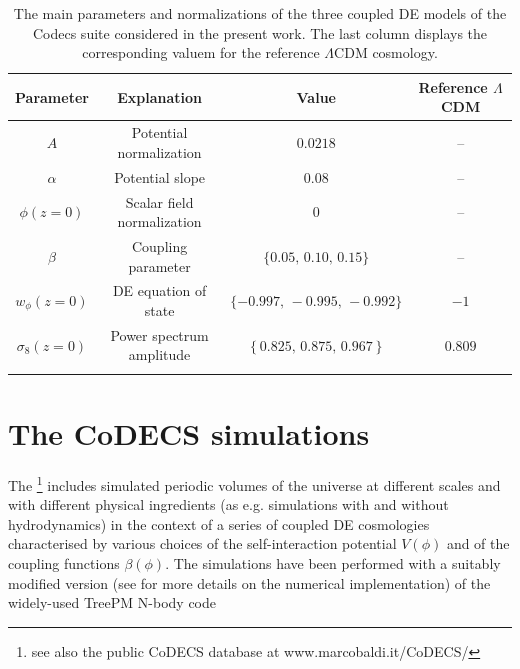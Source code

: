 \begin{table}
\footnotesize
\centering{}\label{tab:models} %
\begin{tabular}{ccc|c}
\textbf{Parameter}  & \textbf{Explanation}  & \textbf{Value}  & \textbf{Reference $\Lambda$CDM}\tabularnewline
\hline 
\hline 
$A$  & Potential normalization  & $0.0218$  & -- \tabularnewline
$\alpha$  & Potential slope  & $0.08$  & -- \tabularnewline
$\phi(z=0)$  & Scalar field normalization  & $0$  & -- \tabularnewline
$\beta$  & Coupling parameter  & $\{0.05,\,0.10,\,0.15\}$  & -- \tabularnewline
$w_{\phi}(z=0)$  & DE equation of state  & $\{-0.997,\,-0.995,\,-0.992\}$  & $-1$ \tabularnewline
$\sigma_{8}(z=0)$  & Power spectrum amplitude  & $\left\{ 0.825,\,0.875,\,0.967\right\} $  & $0.809$ \tabularnewline
\hline 
\small
\end{tabular}
\caption[Parameters of the coupled DE models with constant coupling.]{\label{tab:normalization-conventions-codecs} The main parameters
and normalizations of the three coupled DE models of the Codecs
suite considered in the present work. The last column displays the
corresponding valuem for the reference $\Lambda$CDM cosmology.}
\end{table}
\normalsize


\section{The CoDECS simulations}

The %
\footnote{see also the public {\small{}{}{}{}{}{}{}{}{}CoDECS} database
at www.marcobaldi.it/CoDECS/%
}{\small{} includes simulated periodic volumes of the universe at different
scales and with different physical ingredients (as e.g. simulations
with and without hydrodynamics) in the context of a series of coupled
DE cosmologies characterised by various choices of the self-interaction
potential $V(\phi)$ and of the coupling functions $\beta(\phi)$.
The simulations have been performed with a suitably modified version
(see \citep{baldi_codecs_2012} for more details on the numerical
implementation) of the widely-used TreePM N-body code }


